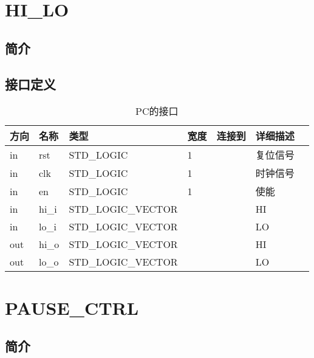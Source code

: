 \documentclass{article}
\begin{document}
\section{HI_LO}
\label{sec:HI_LO}

\subsection{简介}

\FloatBarrier
\subsection{接口定义}

\begin{table}
    \centering
    \begin{tabular}{llllllp{2cm}}
    \toprule
    方向 & 名称 & 类型 & 宽度 & 连接到 & 详细描述 \\ \midrule
    in & rst\label{HI/LO:rst} & STD_LOGIC & 1 & \nameref{sec:MIPS_CPU} & 复位信号 \\
    in & clk\label{HI/LO:clk} & STD_LOGIC & 1 & \nameref{sec:MIPS_CPU} & 时钟信号 \\
    in & en\label{HI/LO:en} & STD_LOGIC & 1 & \nameref{sec:MEM/WB} & 使能 \\
    in & hi_i\label{HI/LO:hi_i} & STD_LOGIC_VECTOR & \nameref{const:REG_DATA_LEN} & \nameref{sec:MEM/WB} & HI \\
    in & lo_i\label{HI/LO:lo_i} & STD_LOGIC_VECTOR & \nameref{const:REG_DATA_LEN} & \nameref{sec:MEM/WB} & LO \\
    out & hi_o\label{HI/LO:hi_o} & STD_LOGIC_VECTOR & \nameref{const:REG_DATA_LEN} & \nameref{sec:EX} & HI \\
    out & lo_o\label{HI/LO:lo_o} & STD_LOGIC_VECTOR & \nameref{const:REG_DATA_LEN} & \nameref{sec:EX} & LO \\
    \bottomrule
    \end{tabular}
    \caption {PC的接口}
\end{table}
\FloatBarrier

\section{PAUSE_CTRL}
\label{sec:PAUSE_CTRL}

\subsection{简介}

\FloatBarrier
\end{document}
